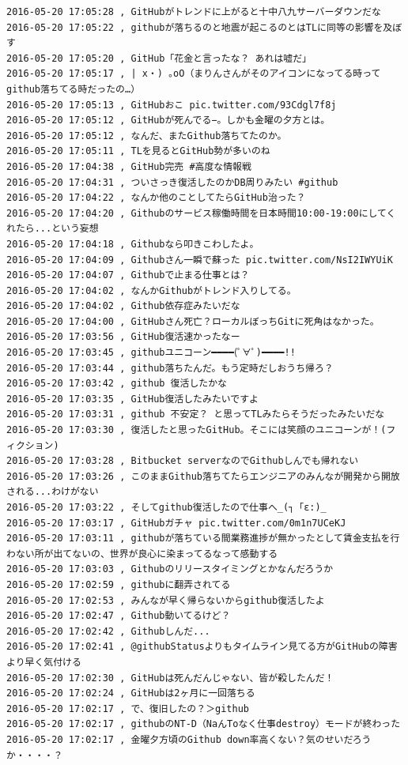 \begin{verbatim}
2016-05-20 17:05:28 , GitHubがトレンドに上がると十中八九サーバーダウンだな
2016-05-20 17:05:22 , githubが落ちるのと地震が起こるのとはTLに同等の影響を及ぼす
2016-05-20 17:05:20 , GitHub「花金と言ったな？ あれは嘘だ」
2016-05-20 17:05:17 , | x・) ｡oO（まりんさんがそのアイコンになってる時ってgithub落ちてる時だったの…）
2016-05-20 17:05:13 , GitHubおこ pic.twitter.com/93Cdgl7f8j
2016-05-20 17:05:12 , GitHubが死んでる−。しかも金曜の夕方とは。
2016-05-20 17:05:12 , なんだ、またGithub落ちてたのか。
2016-05-20 17:05:11 , TLを見るとGitHub勢が多いのね
2016-05-20 17:04:38 , GitHub完売 #高度な情報戦
2016-05-20 17:04:31 , ついさっき復活したのかDB周りみたい #github
2016-05-20 17:04:22 , なんか他のことしてたらGitHub治った？
2016-05-20 17:04:20 , Githubのサービス稼働時間を日本時間10:00-19:00にしてくれたら...という妄想
2016-05-20 17:04:18 , Githubなら叩きこわしたよ。
2016-05-20 17:04:09 , Githubさん一瞬で蘇った pic.twitter.com/NsI2IWYUiK
2016-05-20 17:04:07 , Githubで止まる仕事とは？
2016-05-20 17:04:02 , なんかGithubがトレンド入りしてる。
2016-05-20 17:04:02 , Github依存症みたいだな
2016-05-20 17:04:00 , GitHubさん死亡？ローカルぼっちGitに死角はなかった。
2016-05-20 17:03:56 , GitHub復活速かったなー
2016-05-20 17:03:45 , githubユニコーン━━━━(ﾟ∀ﾟ)━━━━!!
2016-05-20 17:03:44 , github落ちたんだ。もう定時だしおうち帰ろ？
2016-05-20 17:03:42 , github 復活したかな
2016-05-20 17:03:35 , GitHub復活したみたいですよ
2016-05-20 17:03:31 , github 不安定？ と思ってTLみたらそうだったみたいだな
2016-05-20 17:03:30 , 復活したと思ったGitHub。そこには笑顔のユニコーンが！(フィクション)
2016-05-20 17:03:28 , Bitbucket serverなのでGithubしんでも帰れない
2016-05-20 17:03:26 , このままGithub落ちてたらエンジニアのみんなが開発から開放される...わけがない
2016-05-20 17:03:22 , そしてgithub復活したので仕事へ_(┐「ε:)_
2016-05-20 17:03:17 , GitHubガチャ pic.twitter.com/0m1n7UCeKJ
2016-05-20 17:03:11 , githubが落ちている間業務進捗が無かったとして賃金支払を行わない所が出てないの、世界が良心に染まってるなって感動する
2016-05-20 17:03:03 , Githubのリリースタイミングとかなんだろうか
2016-05-20 17:02:59 , githubに翻弄されてる
2016-05-20 17:02:53 , みんなが早く帰らないからgithub復活したよ
2016-05-20 17:02:47 , Github動いてるけど？
2016-05-20 17:02:42 , Githubしんだ...
2016-05-20 17:02:41 , @githubStatusよりもタイムライン見てる方がGitHubの障害より早く気付ける
2016-05-20 17:02:30 , GitHubは死んだんじゃない、皆が殺したんだ！
2016-05-20 17:02:24 , GitHubは2ヶ月に一回落ちる
2016-05-20 17:02:17 , で、復旧したの？＞github
2016-05-20 17:02:17 , githubのNT-D（NaんToなく仕事destroy）モードが終わった
2016-05-20 17:02:17 , 金曜夕方頃のGithub down率高くない？気のせいだろうか・・・・？

\end{verbatim}
